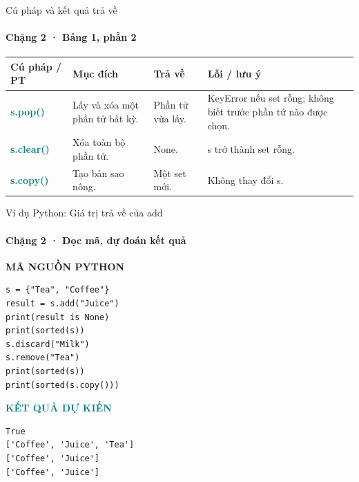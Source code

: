 \documentclass[aspectratio=169,10pt]{beamer}
\begin{document}
\begin{frame}[t]{Cú pháp và kết quả trả về}
\framesubtitle{Chặng 2 · Bảng 1, phần 2}
\begingroup\scriptsize
\renewcommand{\arraystretch}{1.35}
\begin{tabularx}{\linewidth}{>{\raggedright\arraybackslash}p{2.42cm} >{\raggedright\arraybackslash}X >{\raggedright\arraybackslash}p{2.3cm} >{\raggedright\arraybackslash}p{3.15cm}}
\toprule
\textbf{Cú pháp / PT} & \textbf{Mục đích} & \textbf{Trả về} & \textbf{Lỗi / lưu ý} \\
\midrule
\textcolor{teal}{\bfseries s.pop()} & Lấy và xóa một phần tử bất kỳ. & Phần tử vừa lấy. & KeyError nếu set rỗng; không biết trước phần tử nào được chọn. \\
\midrule
\textcolor{teal}{\bfseries s.clear()} & Xóa toàn bộ phần tử. & None. & s trở thành set rỗng. \\
\midrule
\textcolor{teal}{\bfseries s.copy()} & Tạo bản sao nông. & Một set mới. & Không thay đổi s. \\
\midrule
\bottomrule
\end{tabularx}
\endgroup

\end{frame}

\begin{frame}[fragile,t]{Ví dụ Python: Giá trị trả về của add}
\framesubtitle{Chặng 2 · Đọc mã, dự đoán kết quả}
\vspace{-1mm}
{\small\color{muted}\textbf{MÃ NGUỒN PYTHON}}\par\vspace{1mm}
\begin{Verbatim}[fontsize=\scriptsize,frame=single,framesep=4mm,rulecolor=\color{teal!35},breaklines=true]
s = {"Tea", "Coffee"}
result = s.add("Juice")
print(result is None)
print(sorted(s))
s.discard("Milk")
s.remove("Tea")
print(sorted(s))
print(sorted(s.copy()))
\end{Verbatim}
\vspace{1mm}\textcolor{teal}{\scriptsize\textbf{KẾT QUẢ DỰ KIẾN}}
\begin{Verbatim}[fontsize=\scriptsize,breaklines=true]
True
['Coffee', 'Juice', 'Tea']
['Coffee', 'Juice']
['Coffee', 'Juice']
\end{Verbatim}

\end{frame}
\end{document}

